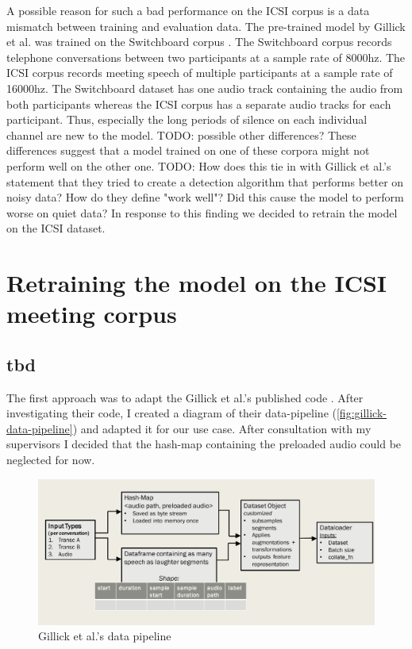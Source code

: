 \documentclass[bsc,frontabs,parskip,deptreport]{infthesis}
\begin{document}
A possible reason for such a bad performance on the ICSI corpus is a data mismatch between training and evaluation data. The pre-trained model by Gillick et al. \citep{gillick2021robust} was trained on the Switchboard corpus \citep{switchboard-corpus}. The Switchboard corpus records telephone conversations between two participants at a sample rate of 8000hz. The ICSI corpus records meeting speech of multiple participants at a sample rate of 16000hz. The Switchboard dataset has one audio track containing the audio from both participants whereas the ICSI corpus has a separate audio tracks for each participant. Thus, especially the long periods of silence on each individual channel are new to the model. 
TODO: possible other differences?
These differences suggest that a model trained on one of these corpora might not perform well on the other one. 
TODO: How does this tie in with Gillick et al.'s statement that they tried to create a detection algorithm that performs better on noisy data? How do they define "work well"? Did this cause the model to perform worse on quiet data?
In response to this finding we decided to retrain the model on the ICSI dataset. 

\chapter{Retraining the model on the ICSI meeting corpus} \label{cha:retraining}
\section{tbd} 
The first approach was to adapt the Gillick et al.'s published code \citep{gillick-codebase}. After investigating their code, I created a diagram of their data-pipeline (\autoref{fig:gillick-data-pipeline}) and adapted it for our use case. After consultation with my supervisors I decided that the hash-map containing the preloaded audio could be neglected for now. 

\begin{figure}
    \centering
    \includegraphics[width=14cm]{imgs/diagrams/Gillick_et_al_data_pipeline.png}
    \caption{Gillick et al.'s data pipeline}
    \label{fig:gillick-data-pipeline}
\end{figure}
\end{document}
